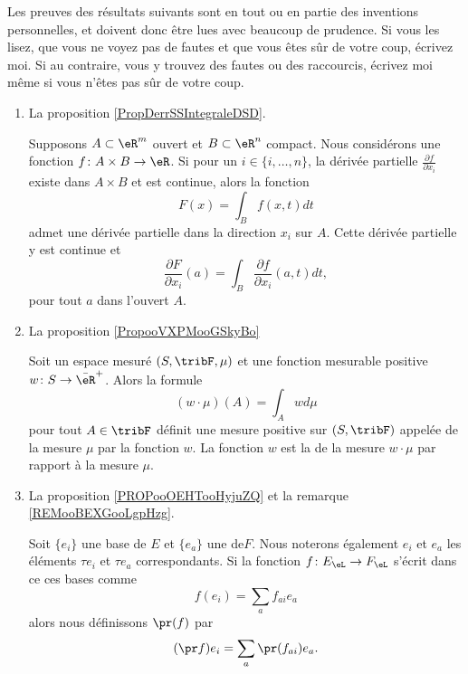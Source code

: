 Les preuves des résultats suivants sont en tout ou en partie des inventions personnelles, et doivent donc être lues avec beaucoup de prudence. Si vous les lisez, que vous ne voyez pas de fautes et que vous êtes sûr de votre coup, écrivez moi. Si au contraire, vous y trouvez des fautes ou des raccourcis, écrivez moi même si vous n'êtes pas sûr de votre coup.
\begin{enumerate}
    \item
        La proposition \ref{PropDerrSSIntegraleDSD}.
        \begin{proposition}
    Supposons $A\subset\eR^m$ ouvert et $B\subset\eR^n$ compact. Nous considérons une fonction \( f\colon A\times B\to \eR\). Si pour un $i\in\{ i,\ldots,n \}$, la dérivée partielle $\frac{ \partial f }{ \partial x_i }$ existe dans $A\times B$ et est continue, alors la fonction
    \begin{equation}
        F(x)=\int_Bf(x,t)dt
    \end{equation}
    admet une dérivée partielle dans la direction \( x_i\) sur \( A\). Cette dérivée partielle y est continue et
    \begin{equation}
        \frac{ \partial F }{ \partial x_i }(a)=\int_B\frac{ \partial f }{ \partial x_i }(a,t)dt,
    \end{equation}
    pour tout \( a\) dans l'ouvert \( A\).
\end{proposition}
        \item
            La proposition \ref{PropooVXPMooGSkyBo}
            \begin{proposition}
    Soit un espace mesuré \( (S,\tribF,\mu)\) et une fonction mesurable positive \( w\colon S\to \bar\eR^+\). Alors la formule
    \begin{equation}
        (w\cdot \mu)(A)=\int_Awd\mu
    \end{equation}
    pour tout \( A\in \tribF\) définit une mesure positive sur \( (S,\tribF)\) appelée  de la mesure \( \mu\) par la fonction \( w\). La fonction \( w\) est la  de la mesure \( w\cdot \mu\) par rapport à la mesure \( \mu\).
            \end{proposition}
        \item
            La proposition \ref{PROPooOEHTooHyjuZQ} et la remarque \ref{REMooBEXGooLgpHzg}.

Soit \( \{ e_i \}\) une base de \( E \) et \(\{ e_a \}\) une  de\( F\). Nous noterons également \( e_i\) et \( e_a\) les éléments \( \tau e_i\) et \( \tau e_a\) correspondants. Si la fonction \( f\colon E_{\eL}\to F_{\eL}\) s'écrit dans ce ces bases comme
\begin{equation}
    f(e_i)=\sum_af_{ai}e_a
\end{equation}
alors nous définissons \( \pr(f)\) par 
\begin{equation}        \label{EQooUWJLooTsbGZj}
    (\pr f)e_i=\sum_a\pr(f_{ai})e_a.
\end{equation}


\end{enumerate}
